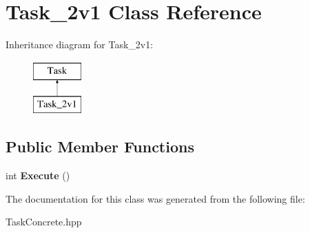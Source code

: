 \hypertarget{classTask__2v1}{\section{\-Task\-\_\-2v1 \-Class \-Reference}
\label{classTask__2v1}
}
\-Inheritance diagram for \-Task\-\_\-2v1\-:\begin{figure}[H]
\begin{center}
\leavevmode
\includegraphics[height=2.000000cm]{classTask__2v1}
\end{center}
\end{figure}
\subsection*{\-Public \-Member \-Functions}
\begin{DoxyCompactItemize}
\item 
\hypertarget{classTask__2v1_ae401aade7c53525be5e8e009f5f43a01}{int {\bfseries \-Execute} ()}\label{classTask__2v1_ae401aade7c53525be5e8e009f5f43a01}

\end{DoxyCompactItemize}


\-The documentation for this class was generated from the following file\-:\begin{DoxyCompactItemize}
\item 
\-Task\-Concrete.\-hpp\end{DoxyCompactItemize}
